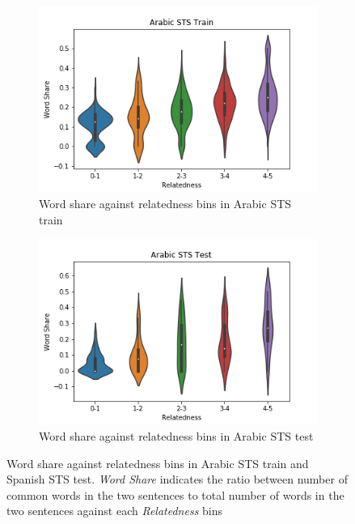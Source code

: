 \begin{enumerate}
\begin{figure}
	\captionsetup[subfigure]{justification=centering}
	\centering
	\begin{subfigure}[b]{.5\textwidth}
		\centering
		\includegraphics[width=\textwidth]{figures/semantic_textual_similarity/introduction/arabic_sts_train_word_share.png}
		\caption{Word share against relatedness bins in Arabic STS train}
		\label{fig:arabic_sts_train_word_share}
	\end{subfigure}%
	\begin{subfigure}[b]{.5\textwidth}
		\centering
		\includegraphics[width=\textwidth]{figures/semantic_textual_similarity/introduction/arabic_sts_test_word_share.png}
		\caption{Word share against relatedness bins in Arabic STS test}
		\label{fig:arabic_sts_test_word_share}
	\end{subfigure}
	\caption[Word share against relatedness bins in Arabic STS train and Arabic STS test.]{Word share against relatedness bins in Arabic STS train and Spanish STS test. \textit{Word Share} indicates the ratio between number of common words in the two sentences to total number of words in the two sentences against each \textit{Relatedness} bins}
	\label{fig:arabic_sts_word_share}
\end{figure}



\end{enumerate}
